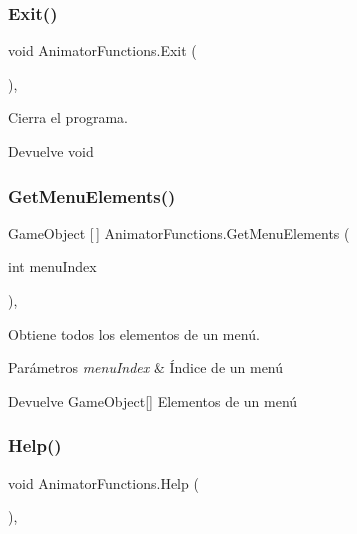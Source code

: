 \subsubsection{\texorpdfstring{Exit()}{Exit()}}
{\footnotesize\ttfamily void Animator\+Functions.\+Exit (\begin{DoxyParamCaption}{ }\end{DoxyParamCaption})\hspace{0.3cm}{\ttfamily [inline]}, {\ttfamily [private]}}

Cierra el programa. \begin{DoxyReturn}{Devuelve}
void 
\end{DoxyReturn}
\mbox{\label{class_animator_functions_af53ea51e66124e05ea5f82080d8e2b6c}} 
\subsubsection{\texorpdfstring{GetMenuElements()}{GetMenuElements()}}
{\footnotesize\ttfamily Game\+Object \mbox{[}$\,$\mbox{]} Animator\+Functions.\+Get\+Menu\+Elements (\begin{DoxyParamCaption}\item[{int}]{menu\+Index }\end{DoxyParamCaption})\hspace{0.3cm}{\ttfamily [inline]}, {\ttfamily [private]}}

Obtiene todos los elementos de un menú. 
\begin{DoxyParams}{Parámetros}
{\em menu\+Index} & Índice de un menú \\
\hline
\end{DoxyParams}
\begin{DoxyReturn}{Devuelve}
Game\+Object\mbox{[}\mbox{]} Elementos de un menú 
\end{DoxyReturn}
\mbox{\label{class_animator_functions_a7cb183fbd7ac3ebb33ae33d67453830b}} 
\subsubsection{\texorpdfstring{Help()}{Help()}}
{\footnotesize\ttfamily void Animator\+Functions.\+Help (\begin{DoxyParamCaption}{ }\end{DoxyParamCaption})\hspace{0.3cm}{\ttfamily [inline]}, {\ttfamily [private]}}

